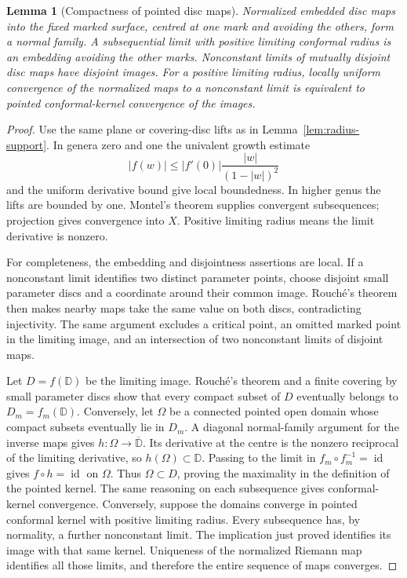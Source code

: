 \documentclass[11pt,a4paper]{article}
\newtheorem{lemma}[theorem]{Lemma}
\theoremstyle{definition}
\newcommand{\id}{\operatorname{id}}
\begin{document}
\begin{lemma}[Compactness of pointed disc maps]\label{lem:disc-normality}
Normalized embedded disc maps into the fixed marked surface, centred at one mark and avoiding the others, form a normal family. A subsequential limit with positive limiting conformal radius is an embedding avoiding the other marks. Nonconstant limits of mutually disjoint disc maps have disjoint images. For a positive limiting radius, locally uniform convergence of the normalized maps to a nonconstant limit is equivalent to pointed conformal-kernel convergence of the images.
\end{lemma}
\begin{proof}
Use the same plane or covering-disc lifts as in Lemma~\ref{lem:radius-support}. In genera zero and one the univalent growth estimate \cite[Appendix, p.~10]{Siu}
\[
       |f(w)|\le |f'(0)|\frac{|w|}{(1-|w|)^2}
\]
and the uniform derivative bound give local boundedness. In higher genus the lifts are bounded by one. Montel's theorem supplies convergent subsequences; projection gives convergence into $X$. Positive limiting radius means the limit derivative is nonzero.

For completeness, the embedding and disjointness assertions are local. If a nonconstant limit identifies two distinct parameter points, choose disjoint small parameter discs and a coordinate around their common image. Rouch\'e's theorem then makes nearby maps take the same value on both discs, contradicting injectivity. The same argument excludes a critical point, an omitted marked point in the limiting image, and an intersection of two nonconstant limits of disjoint maps.

Let $D=f(\mathbb D)$ be the limiting image. Rouch\'e's theorem and a finite covering by small parameter discs show that every compact subset of $D$ eventually belongs to $D_m=f_m(\mathbb D)$. Conversely, let $\Omega$ be a connected pointed open domain whose compact subsets eventually lie in $D_m$. A diagonal normal-family argument for the inverse maps gives $h:\Omega\to\overline{\mathbb D}$. Its derivative at the centre is the nonzero reciprocal of the limiting derivative, so $h(\Omega)\subset\mathbb D$. Passing to the limit in $f_m\circ f_m^{-1}=\id$ gives $f\circ h=\id$ on $\Omega$. Thus $\Omega\subset D$, proving the maximality in the definition of the pointed kernel. The same reasoning on each subsequence gives conformal-kernel convergence. Conversely, suppose the domains converge in pointed conformal kernel with positive limiting radius. Every subsequence has, by normality, a further nonconstant limit. The implication just proved identifies its image with that same kernel. Uniqueness of the normalized Riemann map identifies all those limits, and therefore the entire sequence of maps converges.
\end{proof}
\end{document}
